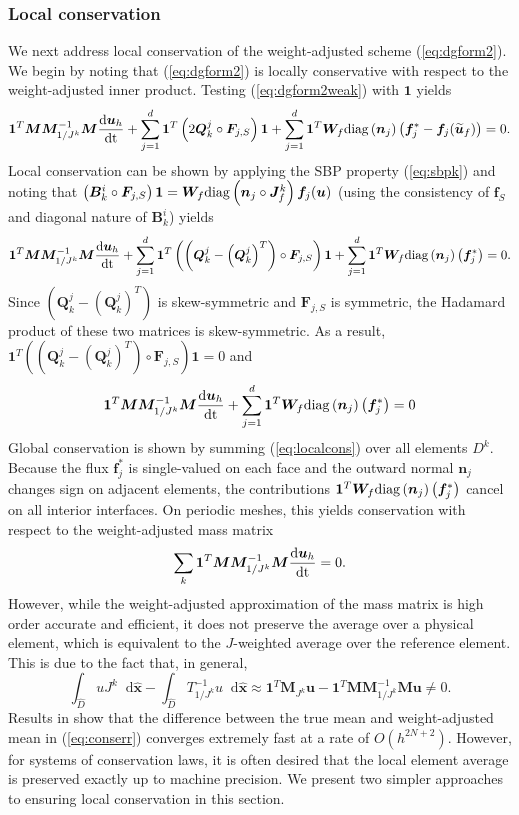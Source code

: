 \documentclass[preprint,10pt]{article}
\theoremstyle{definition}
\theoremstyle{lemma}
\theoremstyle{theorem}
\theoremstyle{assumption}
\renewcommand{\hat}{\widehat}
\renewcommand{\tilde}{\widetilde}
\newcommand{\td}[2]{\frac{{\rm d}#1}{{\rm d}{\rm #2}}}
\newcommand{\LRp}[1]{\left( #1 \right)}
\newcommand{\diag}[1]{{\rm diag}\LRp{#1}}
\newcommand*\diff[1]{\mathop{}\!{\mathrm{d}#1}} %
\begin{document}
{\subsubsection{Local conservation}

We next address local conservation of the weight-adjusted scheme (\ref{eq:dgform2}).  We begin by noting that (\ref{eq:dgform2}) is locally conservative with respect to the weight-adjusted inner product.  Testing (\ref{eq:dgform2weak}) with $\bm{1}$ yields
\[
\bm{1}^T\bm{M}\bm{M}_{1/J^k}^{-1}\bm{M}\td{\bm{u}_h}{t} + 
\sum_{j=1}^d \bm{1}^T \LRp{2\bm{Q}^j_k \circ \bm{F}_{j,S}}\bm{1} + \sum_{j=1}^d \bm{1}^T\bm{W}_f \diag{\bm{n}_j}\LRp{\bm{f}_j^* - \bm{f}_j(\tilde{\bm{u}}_f)} = 0.
\]
Local conservation can be shown by applying the SBP property (\ref{eq:sbpk}) and noting that $\LRp{\bm{B}^i_k \circ \bm{F}_{j,S}}\bm{1} = \bm{W}_f\diag{\bm{n}_j \circ \bm{J}^k_f}\bm{f}_j(\bm{u})$ (using the consistency of $\bm{f}_S$ and diagonal nature of $\bm{B}^i_k$) yields
\[
\bm{1}^T\bm{M}\bm{M}_{1/J^k}^{-1}\bm{M}\td{\bm{u}_h}{t} + 
\sum_{j=1}^d \bm{1}^T \LRp{\LRp{\bm{Q}^j_k-\LRp{\bm{Q}^j_k}^T} \circ \bm{F}_{j,S}}\bm{1} + \sum_{j=1}^d \bm{1}^T\bm{W}_f \diag{\bm{n}_j}\LRp{\bm{f}_j^*} = 0.
\]
Since $\LRp{\bm{Q}^j_k-\LRp{\bm{Q}^j_k}^T} $ is skew-symmetric and $\bm{F}_{j,S}$ is symmetric, the Hadamard product of these two matrices is skew-symmetric.  As a result, $\bm{1}^T \LRp{\LRp{\bm{Q}^j_k-\LRp{\bm{Q}^j_k}^T} \circ \bm{F}_{j,S}}\bm{1} = 0$ and 
\begin{equation}
\bm{1}^T\bm{M}\bm{M}_{1/J^k}^{-1}\bm{M}\td{\bm{u}_h}{t} + \sum_{j=1}^d \bm{1}^T\bm{W}_f \diag{\bm{n}_j}\LRp{\bm{f}_j^*} = 0
\label{eq:localcons}
\end{equation}
Global conservation is shown by summing (\ref{eq:localcons}) over all elements $D^k$.  Because the flux $\bm{f}_j^*$ is single-valued on each face and the outward normal $\bm{n}_j$ changes sign on adjacent elements, the contributions $\bm{1}^T\bm{W}_f \diag{\bm{n}_j}\LRp{\bm{f}_j^*}$ cancel on all interior interfaces.  On periodic meshes, this yields conservation with respect to the weight-adjusted mass matrix
\[
\sum_k \bm{1}^T\bm{M}\bm{M}_{1/J^k}^{-1}\bm{M}\td{\bm{u}_h}{t} = 0.
\]
However, while the weight-adjusted approximation of the mass matrix is high order accurate and efficient, it does not preserve the average over a physical element, which is equivalent to the $J$-weighted average over the reference element.  This is due to the fact that, in general,
\begin{equation}
\int_{\hat{D}}u J^k \diff{\hat{\bm{x}}} - \int_{\hat{D}} T_{1/J^k}^{-1}u \diff{\hat{\bm{x}}} \approx \bm{1}^T\bm{M}_{J^k}\bm{u} - \bm{1}^T\bm{M}\bm{M}_{1/J^k}^{-1}\bm{M}\bm{u} \neq 0.  
\label{eq:conserr}
\end{equation}
Results in \cite{chan2016weight1} show that the difference between the true mean and weight-adjusted mean in (\ref{eq:conserr}) converges extremely fast at a rate of $O(h^{2N+2})$.  However, for systems of conservation laws, it is often desired that the local element average is preserved exactly up to machine precision.  We present two simpler approaches to ensuring local conservation in this section.  

}
\end{document}
